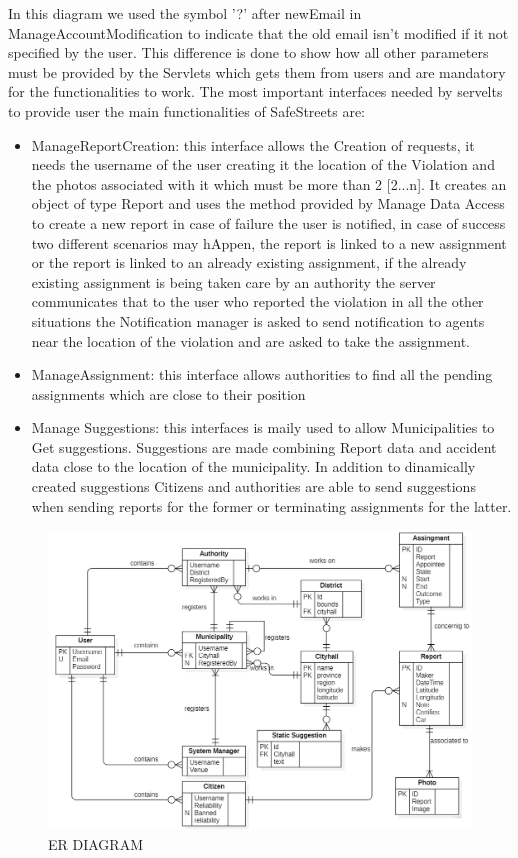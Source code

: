In this diagram we used the symbol '?' after newEmail in ManageAccountModification to indicate that the old email isn't modified  if it not specified by the user. This difference is done to show how all other parameters must be provided by the Servlets which gets them from users and are mandatory for the functionalities to work.
The most important interfaces needed by servelts to provide user the main functionalities of SafeStreets are:
\begin{itemize}
\item ManageReportCreation: this interface allows the Creation of requests, it needs the username of the user creating it the location of the Violation and the photos associated with it which must be more than 2 [2...n]. It creates an object of type Report and uses the method provided by Manage Data Access to create a new report in case of failure the user is notified, in case of success two different scenarios may hAppen, the report is linked to a new assignment or the report is linked to an already existing assignment, if the already existing assignment is being taken care by an authority the server communicates that to the user who reported the violation in all the other situations the Notification manager is asked to send notification to agents near the location of the violation and are asked to take the assignment.
\item ManageAssignment: this interface allows authorities to find all the pending assignments which are close to their position
\item Manage Suggestions: this interfaces is maily used to allow Municipalities to Get suggestions. Suggestions are made combining Report data and accident data close to the location of the municipality. In addition to dinamically created suggestions Citizens and authorities are able to send suggestions when sending reports for the former or terminating assignments for the latter.
\end{itemize}
\begin{figure}[H]
\centering
\includegraphics[width=\textwidth]{Images/ER.png}
\caption{\label{fig:ComWI}ER DIAGRAM }
\end{figure}
